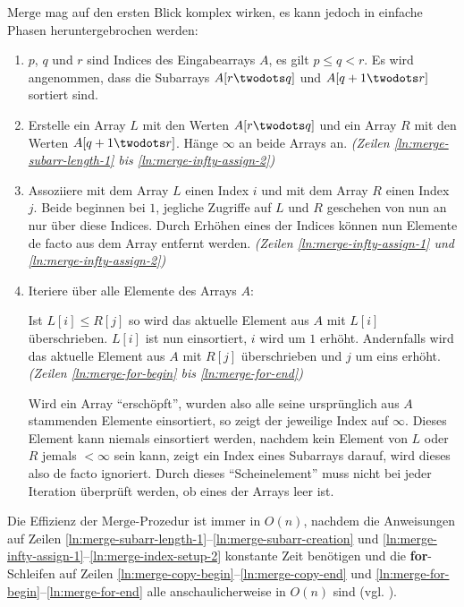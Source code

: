 $\text{Merge}$ mag auf den ersten Blick komplex wirken, es kann jedoch in einfache Phasen heruntergebrochen werden:
\begin{enumerate}[start=0]
    \item $p$, $q$ und $r$ sind Indices des Eingabearrays $A$, es gilt $p \leq q < r$. Es wird angenommen, dass die Subarrays $A[r \twodots q]$ und $A[q + 1 \twodots r]$ sortiert sind.

    \item Erstelle ein Array $L$ mit den Werten $A[r \twodots q]$ und ein Array $R$ mit den Werten $A[q + 1 \twodots r]$. Hänge $\infty$ an beide Arrays an. \emph{(Zeilen \ref{ln:merge-subarr-length-1} bis \ref{ln:merge-infty-assign-2})}

    \item Assoziiere mit dem Array $L$ einen Index $i$ und mit dem Array $R$ einen Index $j$. Beide beginnen bei $1$, jegliche Zugriffe auf $L$ und $R$ geschehen von nun an nur über diese Indices. Durch Erhöhen eines der Indices können nun Elemente de facto aus dem Array entfernt werden. \emph{(Zeilen \ref{ln:merge-infty-assign-1} und \ref{ln:merge-infty-assign-2})}

    \item Iteriere über alle Elemente des Arrays $A$:

    Ist $L[i] \leq R[j]$ so wird das aktuelle Element aus $A$ mit $L[i]$ überschrieben. $L[i]$ ist nun einsortiert, $i$ wird um $1$ erhöht. Andernfalls wird das aktuelle Element aus $A$ mit $R[j]$ überschrieben und $j$ um eins erhöht. \emph{(Zeilen \ref{ln:merge-for-begin} bis \ref{ln:merge-for-end})}

    Wird ein Array \enquote{erschöpft}, wurden also alle seine ursprünglich aus $A$ stammenden Elemente einsortiert, so zeigt der jeweilige Index auf $\infty$. Dieses Element kann niemals einsortiert werden, nachdem kein Element von $L$ oder $R$ jemals $< \infty$ sein kann, zeigt ein Index eines Subarrays darauf, wird dieses also de facto ignoriert. Durch dieses \enquote{Scheinelement} muss nicht bei jeder Iteration überprüft werden, ob eines der Arrays leer ist.
\end{enumerate}

Die Effizienz der $\text{Merge}$-Prozedur ist immer in $O(n)$, nachdem die Anweisungen auf Zeilen \ref{ln:merge-subarr-length-1}--\ref{ln:merge-subarr-creation} und \ref{ln:merge-infty-assign-1}--\ref{ln:merge-index-setup-2} konstante Zeit benötigen und die \textbf{for}-Schleifen auf Zeilen \ref{ln:merge-copy-begin}--\ref{ln:merge-copy-end} und \ref{ln:merge-for-begin}--\ref{ln:merge-for-end} alle anschaulicherweise in $O(n)$ sind (vgl. \cite[34]{clrs2001}).

